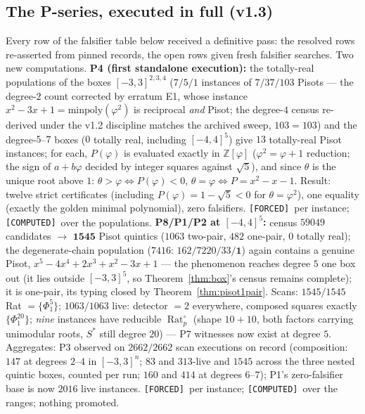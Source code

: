 \documentclass[11pt]{article}
\newcommand{\F}{\textnormal{\texttt{[FORCED]}}}
\newcommand{\C}{\textnormal{\texttt{[COMPUTED]}}}
\newcommand{\Z}{\mathbb{Z}}
\newcommand{\Rat}{\operatorname{Rat}}
\theoremstyle{definition}
\begin{document}
\subsection{The P-series, executed in full (v1.3)}\label{sec:pseries}

Every row of the falsifier table below received a definitive pass: the
resolved rows re-asserted from pinned records, the open rows given fresh
falsifier searches. Two new computations. \textbf{P4 (first standalone
execution):} the totally-real populations of the boxes $[-3,3]^{2,3,4}$
($7/5/1$ instances of $7/37/103$ Pisots --- the degree-$2$ count corrected
by erratum E1, whose instance $x^2-3x+1=\mathrm{minpoly}(\varphi^2)$ is
reciprocal \emph{and} Pisot; the degree-$4$ census re-derived under the
v1.2 discipline matches the archived sweep, $103=103$) and the
degree-$5$--$7$ boxes ($0$ totally real, including $[-4,4]^5$) give $13$
totally-real Pisot instances; for each, $P(\varphi)$ is evaluated exactly
in $\Z[\varphi]$ ($\varphi^2=\varphi+1$ reduction; the sign of $a+b\varphi$
decided by integer squares against $\sqrt5$), and since $\theta$ is the
unique root above $1$: $\theta>\varphi\iff P(\varphi)<0$,
$\theta=\varphi\iff P=x^2-x-1$. Result: twelve strict certificates
(including $P(\varphi)=1-\sqrt5<0$ for $\theta=\varphi^2$), one equality
(exactly the golden minimal polynomial), zero falsifiers. \F\ per
instance; \C\ over the populations. \textbf{P8/P1/P2 at $[-4,4]^5$:}
census $59049$ candidates $\to$ $\mathbf{1545}$ Pisot quintics ($1063$
two-pair, $482$ one-pair, $0$ totally real); the degenerate-chain
population ($7416$: $162/7220/33/\mathbf{1}$) again contains a genuine
Pisot, $x^5-4x^4+2x^3+x^2-3x+1$ --- the phenomenon reaches degree $5$ one
box out (it lies outside $[-3,3]^5$, so Theorem~\ref{thm:box}'s census
remains complete); it is one-pair, its typing closed by
Theorem~\ref{thm:pisot1pair}. Scans: $1545/1545$ Rat $=\{\Phi_1^5\}$;
$1063/1063$ live: detector $=2$ everywhere, composed squares exactly
$\{\Phi_1^{20}\}$; \emph{nine} instances have reducible $\Rat_p^{\circ}$
(shape $10{+}10$, both factors carrying unimodular roots, $S^{*}$ still
degree $20$) --- P7 witnesses now exist at degree $5$. Aggregates: P3
observed on $2662/2662$ scan executions on record (composition: $147$ at
degrees $2$--$4$ in $[-3,3]^n$; $83$ and $313$-live and $1545$ across the
three nested quintic boxes, counted per run; $160$ and $414$ at degrees
$6$--$7$); P1's zero-falsifier base is now $2016$ live instances. \F\ per
instance; \C\ over the ranges; nothing promoted.
\end{document}
